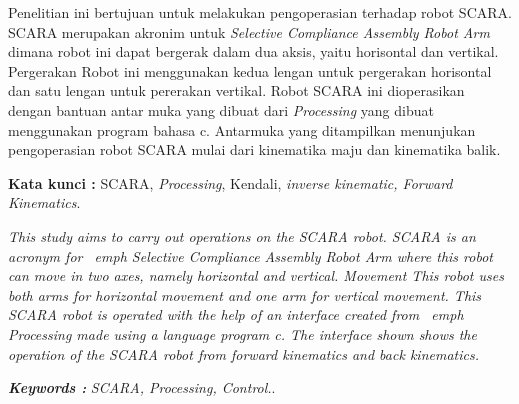 \documentclass{DTEDI_KP}
\begin{document}
\tableofcontents
{}
\listoftables
{}
\listoffigures
{}


\begin{abstractind}
	Penelitian ini bertujuan untuk melakukan pengoperasian terhadap robot SCARA. SCARA merupakan akronim untuk \emph{Selective Compliance Assembly Robot Arm} dimana robot ini dapat bergerak dalam dua aksis, yaitu horisontal dan vertikal. Pergerakan Robot ini menggunakan kedua lengan untuk pergerakan horisontal dan satu lengan untuk pererakan vertikal. Robot SCARA ini dioperasikan dengan bantuan antar muka yang dibuat dari \emph{Processing} yang dibuat menggunakan program bahasa c. Antarmuka yang ditampilkan menunjukan pengoperasian robot SCARA mulai dari kinematika maju dan kinematika balik.


\bigskip
\noindent
\textbf{Kata kunci :} SCARA, \emph{Processing}, Kendali, \emph{inverse kinematic, Forward Kinematics}.
\end{abstractind}
	
\begin{abstracteng}
\emph{
This study aims to carry out operations on the SCARA robot. SCARA is an acronym for \ emph {Selective Compliance Assembly Robot Arm} where this robot can move in two axes, namely horizontal and vertical. Movement This robot uses both arms for horizontal movement and one arm for vertical movement. This SCARA robot is operated with the help of an interface created from \ emph {Processing} made using a language program c. The interface shown shows the operation of the SCARA robot from forward kinematics and back kinematics.}


\bigskip
\noindent
\textbf{\emph{Keywords :}} \emph{SCARA, \emph{Processing}, Control.}.
\end{abstracteng}
\end{document}
